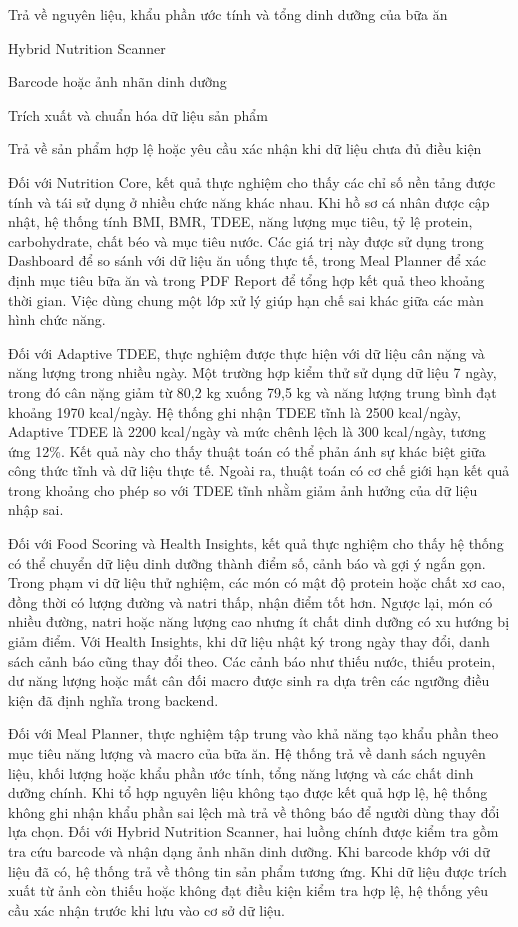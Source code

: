 Trả về nguyên liệu, khẩu phần ước tính và tổng dinh dưỡng của bữa ăn

Hybrid Nutrition Scanner

Barcode hoặc ảnh nhãn dinh dưỡng

Trích xuất và chuẩn hóa dữ liệu sản phẩm

Trả về sản phẩm hợp lệ hoặc yêu cầu xác nhận khi dữ liệu chưa đủ điều kiện

Đối với Nutrition Core, kết quả thực nghiệm cho thấy các chỉ số nền tảng được tính và tái sử dụng ở nhiều chức năng khác nhau. Khi hồ sơ cá nhân được cập nhật, hệ thống tính BMI, BMR, TDEE, năng lượng mục tiêu, tỷ lệ protein, carbohydrate, chất béo và mục tiêu nước. Các giá trị này được sử dụng trong Dashboard để so sánh với dữ liệu ăn uống thực tế, trong Meal Planner để xác định mục tiêu bữa ăn và trong PDF Report để tổng hợp kết quả theo khoảng thời gian. Việc dùng chung một lớp xử lý giúp hạn chế sai khác giữa các màn hình chức năng.

Đối với Adaptive TDEE, thực nghiệm được thực hiện với dữ liệu cân nặng và năng lượng trong nhiều ngày. Một trường hợp kiểm thử sử dụng dữ liệu 7 ngày, trong đó cân nặng giảm từ 80,2 kg xuống 79,5 kg và năng lượng trung bình đạt khoảng 1970 kcal/ngày. Hệ thống ghi nhận TDEE tĩnh là 2500 kcal/ngày, Adaptive TDEE là 2200 kcal/ngày và mức chênh lệch là 300 kcal/ngày, tương ứng 12\%. Kết quả này cho thấy thuật toán có thể phản ánh sự khác biệt giữa công thức tĩnh và dữ liệu thực tế. Ngoài ra, thuật toán có cơ chế giới hạn kết quả trong khoảng cho phép so với TDEE tĩnh nhằm giảm ảnh hưởng của dữ liệu nhập sai.

Đối với Food Scoring và Health Insights, kết quả thực nghiệm cho thấy hệ thống có thể chuyển dữ liệu dinh dưỡng thành điểm số, cảnh báo và gợi ý ngắn gọn. Trong phạm vi dữ liệu thử nghiệm, các món có mật độ protein hoặc chất xơ cao, đồng thời có lượng đường và natri thấp, nhận điểm tốt hơn. Ngược lại, món có nhiều đường, natri hoặc năng lượng cao nhưng ít chất dinh dưỡng có xu hướng bị giảm điểm. Với Health Insights, khi dữ liệu nhật ký trong ngày thay đổi, danh sách cảnh báo cũng thay đổi theo. Các cảnh báo như thiếu nước, thiếu protein, dư năng lượng hoặc mất cân đối macro được sinh ra dựa trên các ngưỡng điều kiện đã định nghĩa trong backend.

Đối với Meal Planner, thực nghiệm tập trung vào khả năng tạo khẩu phần theo mục tiêu năng lượng và macro của bữa ăn. Hệ thống trả về danh sách nguyên liệu, khối lượng hoặc khẩu phần ước tính, tổng năng lượng và các chất dinh dưỡng chính. Khi tổ hợp nguyên liệu không tạo được kết quả hợp lệ, hệ thống không ghi nhận khẩu phần sai lệch mà trả về thông báo để người dùng thay đổi lựa chọn. Đối với Hybrid Nutrition Scanner, hai luồng chính được kiểm tra gồm tra cứu barcode và nhận dạng ảnh nhãn dinh dưỡng. Khi barcode khớp với dữ liệu đã có, hệ thống trả về thông tin sản phẩm tương ứng. Khi dữ liệu được trích xuất từ ảnh còn thiếu hoặc không đạt điều kiện kiểm tra hợp lệ, hệ thống yêu cầu xác nhận trước khi lưu vào cơ sở dữ liệu.


